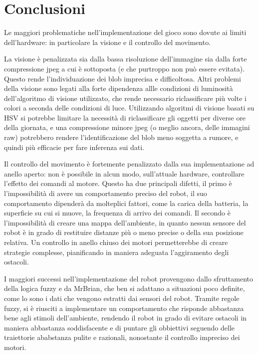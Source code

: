 \chapter{Conclusioni}
\label{cap:conclusioni}

Le maggiori problematiche nell'implementazione del gioco sono dovute ai limiti dell'hardware: in particolare la visione e il controllo del movimento. 

La visione è penalizzata sia dalla bassa risoluzione dell'immagine sia dalla forte compressione jpeg a cui è sottoposta (e che purtroppo non può essere evitata). Questo rende l'individuazione dei blob imprecisa e difficoltosa. Altri problemi della visione sono legati alla forte dipendenza allle condizioni di luminosità dell'algoritmo di visione utilizzato, che rende necessario riclassificare più volte i colori a seconda delle condizioni di luce. Utilizzando algoritmi di visione basati su HSV si potrebbe limitare la necessità di riclassificare gli oggetti per diverse ore della giornata, e una compressione minore jpeg (o meglio ancora, delle immagini raw) potrebbero rendere l'identificazione del blob meno soggetta a rumore, e quindi più efficacie per fare inferenza sui dati.

Il controllo del movimento è fortemente penalizzato dalla sua implementazione ad anello aperto: non è possibile in alcun modo, sull'attuale hardware, controllare l'effetto dei comandi al motore. Questo ha due principali difetti, il primo è l'impossibilità di avere un comportamento preciso del robot, il suo comportamento dipenderà da molteplici fattori, come la carica della batteria, la superficie su cui si muove, la frequenza di arrivo dei comandi. Il secondo è l'impossibilità di creare una mappa dell'ambiente, in quanto nessun sensore del robot è in grado di restituire distanze più o meno precise o della sua posizione relativa. Un controllo in anello chiuso dei motori permetterebbe di creare strategie complesse, pianificando in maniera adeguata l'aggiramento degli ostacoli.

I maggiori successi nell'implementazione del robot provengono dallo sfruttamento della logica fuzzy e da MrBrian, che ben si adattano a situazioni poco definite, come lo sono i dati che vengono estratti dai sensori del robot. Tramite regole fuzzy, si è riusciti a implementare un comportamento che risponde abbastanza bene agli stimoli dell'ambiente, rendendo il robot in grado di evitare ostacoli in maniera abbastanza soddisfacente e di puntare gli obbiettivi seguendo delle traiettorie ababstanza pulite e razionali, nonostante il controllo impreciso dei motori.

